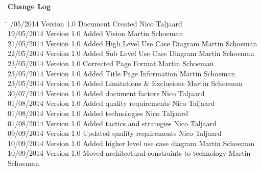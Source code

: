 \documentclass[letterpaper]{article}
\begin{document}
\begin{titlepage}
\begin{center}
\end{center}
\vfill %

\end{titlepage}


	\newpage
		{\LARGE \bf Change Log}\\[2em]
		
		\begin{tabbing}
			\hspace*{2.5cm}\=\hspace*{2.5cm}\=\hspace*{8cm}\=\hspace*{3cm} /05/2014	\> Version 1.0	\> Document Created 							\> Nico Taljaard \\
			19/05/2014  \> Version 1.0  \> Added Vision									\> Martin Schoeman \\
			21/05/2014  \> Version 1.0  \> Added High Level Use Case Diagram			\> Martin Schoeman\\
			22/05/2014  \> Version 1.0  \> Added Sub Level Use Case Diagram				\> Martin Schoeman\\
			23/05/2014  \> Version 1.0  \> Corrected Page Format						\> Martin Schoeman \\
			23/05/2014  \> Version 1.0  \> Added Title Page Information					\> Martin Schoeman \\
			23/05/2014  \> Version 1.0  \> Added Limitations \& Exclusions				\> Martin Schoeman \\
			30/07/2014	\> Version 1.0	\> Added document factors						\> Nico Taljaard \\
			01/08/2014	\> Version 1.0	\> Added quality requirements					\> Nico Taljaard \\
			01/08/2014	\> Version 1.0	\> Added technologies							\> Nico Taljaard \\
			01/08/2014	\> Version 1.0	\> Added tactics and strategies					\> Nico Taljaard \\
			09/09/2014	\> Version 1.0	\> Updated quality requirements					\> Nico Taljaard \\
			10/09/2014 	\> Version 1.0  \> Added higher level use case diagram			\> Martin Schoeman\\
			10/09/2014  \> Version 1.0	\> Moved architectural constraints to technology\> Martin Schoeman\\

\end{tabbing}
\end{document}
